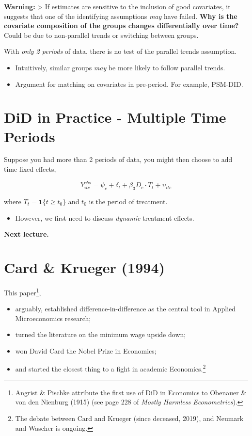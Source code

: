 \documentclass[
  letterpaper,
  DIV=11,
  numbers=noendperiod]{scrreprt}
\providecommand{\tightlist}{%
  \setlength{\itemsep}{0pt}\setlength{\parskip}{0pt}}\usepackage{longtable,booktabs,array}
\theoremstyle{definition}
\theoremstyle{remark}
\begin{document}
\textbf{Warning:} \textgreater{} If estimates are sensitive to the
inclusion of good covariates, it suggests that one of the identifying
assumptions \emph{may} have failed. \textbf{Why is the covariate
composition of the groups changes differentially over time?} Could be
due to non-parallel trends or switching between groups.

With \emph{only 2 periods} of data, there is no test of the parallel
trends assumption.

\begin{itemize}
\tightlist
\item
  Intuitively, similar groups \emph{may} be more likely to follow
  parallel trends.
\item
  Argument for matching on covariates in pre-period. For example,
  PSM-DID.
\end{itemize}

\hypertarget{did-in-practice---multiple-time-periods}{%
\section{DiD in Practice - Multiple Time
Periods}\label{did-in-practice---multiple-time-periods}}

Suppose you had more than 2 periods of data, you might then choose to
add time-fixed effects,

\[
Y^{obs}_{itc} = \psi_c + \delta_t + \beta_3 D_c\cdot T_t + \upsilon_{itc}
\]

where \(T_t=\mathbf{1}\{t\geq t_0\}\) and \(t_0\) is the period of
treatment.

\begin{itemize}
\tightlist
\item
  However, we first need to discuss \emph{dynamic} treatment effects.
\end{itemize}

\textbf{Next lecture.}

\hypertarget{card-krueger-1994}{%
\section{Card \& Krueger (1994)}\label{card-krueger-1994}}

This paper\footnote{Angrist \& Pischke attribute the first use of DiD in
  Economics to Obenauer \& von den Nienburg (1915) (see page 228 of
  \emph{Mostly Harmless Econometrics}).},

\begin{itemize}
\item
  arguably, established difference-in-difference as the central tool in
  Applied Microeconomics research;
\item
  turned the literature on the minimum wage upside down;
\item
  won David Card the Nobel Prize in Economics;
\item
  and started the closest thing to a fight in academic
  Economics.\footnote{The debate between Card and Krueger (since
    deceased, 2019), and Neumark and Wascher is ongoing.}
\end{itemize}
\end{document}
